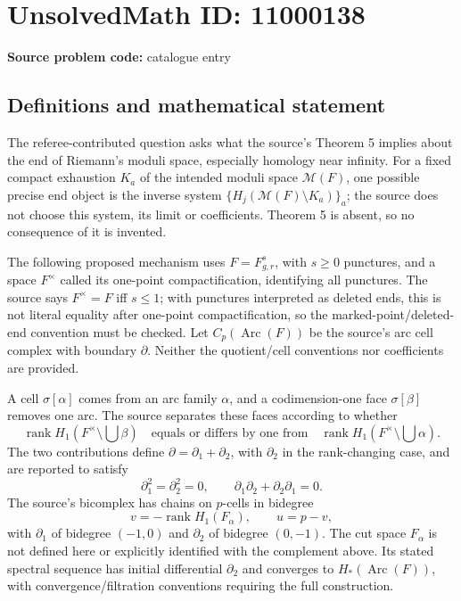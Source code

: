 \documentclass[11pt]{article}
\begin{document}
\section*{UnsolvedMath ID: 11000138}
\textbf{Source problem code:} catalogue entry
\subsection{Definitions and mathematical statement}
The referee-contributed question asks what the source's Theorem 5 implies about the end of Riemann's moduli space, especially homology near infinity. For a fixed compact exhaustion \(K_a\) of the intended moduli space \(\mathcal M(F)\), one possible precise end object is the inverse system \(\{H_j(\mathcal M(F)\setminus K_a)\}_a\); the source does not choose this system, its limit or coefficients. Theorem 5 is absent, so no consequence of it is invented.

The following proposed mechanism uses \(F=F_{g,r}^s\), with \(s\geq0\) punctures, and a space \(F^\times\) called its one-point compactification, identifying all punctures. The source says \(F^\times=F\) iff \(s\leq1\); with punctures interpreted as deleted ends, this is not literal equality after one-point compactification, so the marked-point/deleted-end convention must be checked. Let \(C_p(\operatorname{Arc}(F))\) be the source's arc cell complex with boundary \(\partial\). Neither the quotient/cell conventions nor coefficients are provided.

A cell \(\sigma[\alpha]\) comes from an arc family \(\alpha\), and a codimension-one face \(\sigma[\beta]\) removes one arc. The source separates these faces according to whether
\[\operatorname{rank}H_1(F^\times\setminus\!\bigcup\beta)
\quad\text{equals or differs by one from}\quad
\operatorname{rank}H_1(F^\times\setminus\!\bigcup\alpha).\]
The two contributions define \(\partial=\partial_1+\partial_2\), with \(\partial_2\) in the rank-changing case, and are reported to satisfy
\[\partial_1^2=\partial_2^2=0,\qquad
\partial_1\partial_2+\partial_2\partial_1=0.\]
The source's bicomplex has chains on \(p\)-cells in bidegree
\[v=-\operatorname{rank}H_1(F_\alpha),\qquad u=p-v,\]
with \(\partial_1\) of bidegree \((-1,0)\) and \(\partial_2\) of bidegree \((0,-1)\). The cut space \(F_\alpha\) is not defined here or explicitly identified with the complement above. Its stated spectral sequence has initial differential \(\partial_2\) and converges to \(H_*(\operatorname{Arc}(F))\), with convergence/filtration conventions requiring the full construction.
\end{document}
